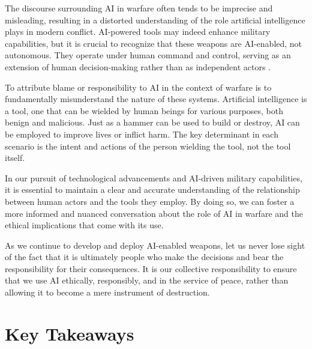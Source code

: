 The discourse surrounding AI in warfare often tends to be imprecise and misleading, resulting in a distorted understanding of the role artificial intelligence plays in modern conflict. AI-powered tools may indeed enhance military capabilities, but it is crucial to recognize that these weapons are AI-enabled, not autonomous. They operate under human command and control, serving as an extension of human decision-making rather than as independent actors \cite{aiwarfare}.

To attribute blame or responsibility to AI in the context of warfare is to fundamentally misunderstand the nature of these systems. Artificial intelligence is a tool, one that can be wielded by human beings for various purposes, both benign and malicious. Just as a hammer can be used to build or destroy, AI can be employed to improve lives or inflict harm. The key determinant in each scenario is the intent and actions of the person wielding the tool, not the tool itself.

In our pursuit of technological advancements and AI-driven military capabilities, it is essential to maintain a clear and accurate understanding of the relationship between human actors and the tools they employ. By doing so, we can foster a more informed and nuanced conversation about the role of AI in warfare and the ethical implications that come with its use.

As we continue to develop and deploy AI-enabled weapons, let us never lose sight of the fact that it is ultimately people who make the decisions and bear the responsibility for their consequences. It is our collective responsibility to ensure that we use AI ethically, responsibly, and in the service of peace, rather than allowing it to become a mere instrument of destruction.

\section{Key Takeaways}


